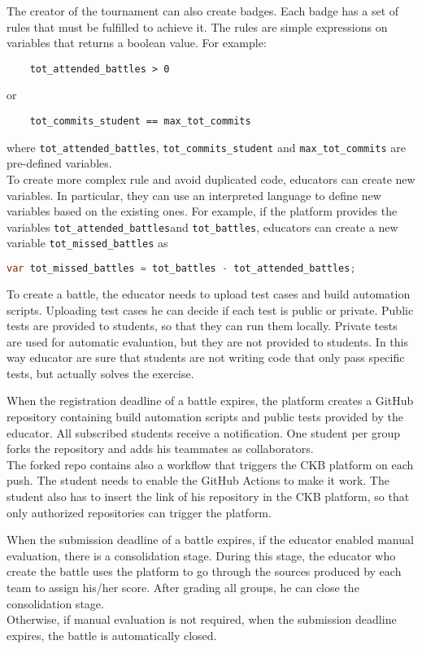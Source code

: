 The creator of the tournament can also create badges.
Each badge has a set of rules that must be fulfilled to achieve it.
The rules are simple expressions on variables that returns a boolean value.
For example:
\begin{lstlisting}
    tot_attended_battles > 0
\end{lstlisting}
or
\begin{lstlisting}
    tot_commits_student == max_tot_commits
\end{lstlisting}
where \lstinline{tot_attended_battles}, \lstinline{tot_commits_student} and \lstinline{max_tot_commits} are pre-defined variables.\\
To create more complex rule and avoid duplicated code, educators can create new variables.
In particular, they can use an interpreted language to define new variables based on the existing ones.
For example, if the platform provides the variables \lstinline{tot_attended_battles}and \lstinline{tot_battles},
educators can create a new variable \lstinline{tot_missed_battles} as
\begin{lstlisting}[language=java, morekeywords={var}, keywordstyle=\color{blue}]
    var tot_missed_battles = tot_battles - tot_attended_battles;
\end{lstlisting}

To create a battle, the educator needs to upload test cases and build automation scripts.
Uploading test cases he can decide if each test is public or private.
Public tests are provided to students, so that they can run them locally.
Private tests are used for automatic evaluation, but they are not provided to students.
In this way educator are sure that students are not writing code that only pass specific tests, but actually solves the exercise.

When the registration deadline of a battle expires, the platform creates a GitHub repository containing build automation scripts and public tests provided by the educator.
All subscribed students receive a notification.
One student per group forks the repository and adds his teammates as collaborators.\\
The forked repo contains also a workflow that triggers the CKB platform on each push.
The student needs to enable the GitHub Actions to make it work.
The student also has to insert the link of his repository in the CKB platform, so that only authorized repositories can trigger the platform.

When the submission deadline of a battle expires, if the educator enabled manual evaluation, there is a consolidation stage.
During this stage, the educator who create the battle uses the platform to go through the sources produced by each team to assign his/her score.
After grading all groups, he can close the consolidation stage.\\
Otherwise, if manual evaluation is not required, when the submission deadline expires, the battle is automatically closed.

